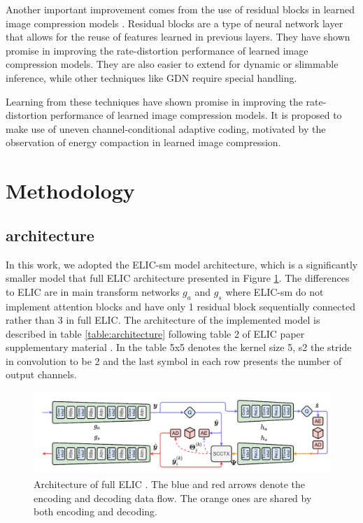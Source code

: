 \documentclass{article}
\begin{document}
Another important improvement comes from the use of residual blocks in learned image compression models \cite{balle2016}. Residual blocks are a type of neural network layer that allows for the reuse of features learned in previous layers. They have shown promise in improving the rate-distortion performance of learned image compression models. They are also easier to extend for dynamic or slimmable inference, while other techniques like GDN require special handling.

Learning from these techniques have shown promise in improving the rate-distortion performance of learned image compression models. It is proposed to make use of uneven channel-conditional adaptive coding, motivated by the observation of energy compaction in learned image compression.

\section{Methodology}
\label{sec:methods}
\subsection{architecture}
\label{sec:architecture}
In this work, we adopted the ELIC-sm model architecture, which is a significantly smaller model that full ELIC architecture presented in Figure \ref{fig:architecture}. The differences to ELIC are in main transform networks $g_a$ and $g_s$ where ELIC-sm do not implement attention blocks and have only 1 residual block sequentially connected rather than 3 in full ELIC. The architecture of the implemented model is described in table \ref{table:architecture} following table 2 of ELIC paper supplementary material \cite{ELIC}. In the table 5x5 denotes the kernel size 5, s2 the stride in convolution to be 2 and the last symbol in each row presents the number of output channels. 

\begin{figure}[h!]
    \centering
    \includegraphics[width=7in]{architecture.png}
    \caption{Architecture of full ELIC \cite{ELIC}. The
blue and red arrows denote the encoding and decoding data flow. The orange ones are shared by both encoding and decoding.}
    \label{fig:architecture}
\end{figure}
\end{document}
